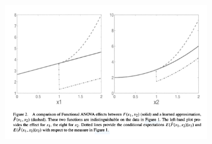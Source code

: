 
\begin{figure}[h]
    \centering
    \includegraphics[width=0.8\textwidth]{images/hooker_2007_figure2.png}
    \label{fig:hooker_graph}
\end{figure}

